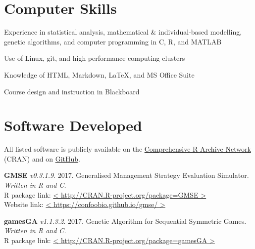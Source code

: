 \documentclass[letterpaper]{article}
\renewenvironment{itemize}{
  \begin{list}{}{
    \setlength{\leftmargin}{1.5em}
  }
}{
  \end{list}
}
\begin{document}
\begin{small}
\section*{Computer Skills}
\begin{itemize}
\item Experience in statistical analysis, mathematical \& individual-based modelling, genetic algorithms, and computer programming in C, R, and MATLAB
\item Use of Linux, git, and high performance computing clusters
\item Knowledge of HTML, Markdown, \LaTeX, and MS Office Suite
\item Course design and instruction in Blackboard
\end{itemize}

\section*{Software Developed}

All listed software is publicly available on the \href{https://cran.r-project.org/}{Comprehensive R Archive Network} (CRAN) and on \href{https://github.com/bradduthie}{GitHub}.

\begin{etaremune}
\item {\bf GMSE} {\it v0.3.1.9}. 2017. Generalised Management Strategy Evaluation Simulator. {\it Written in R and C.} \\
R package link: \href{http://CRAN.R-project.org/package=GMSE}{< http://CRAN.R-project.org/package=GMSE >} \\
Website link: \href{https://confoobio.github.io/gmse/}{< https://confoobio.github.io/gmse/ >}
\item {\bf gamesGA} {\it v1.1.3.2}. 2017. Genetic Algorithm for Sequential Symmetric Games. {\it Written in R and C.} \\
R package link: \href{http://CRAN.R-project.org/package=gamesGA}{< http://CRAN.R-project.org/package=gamesGA >}
\end{etaremune}


\end{small}
\end{document}
